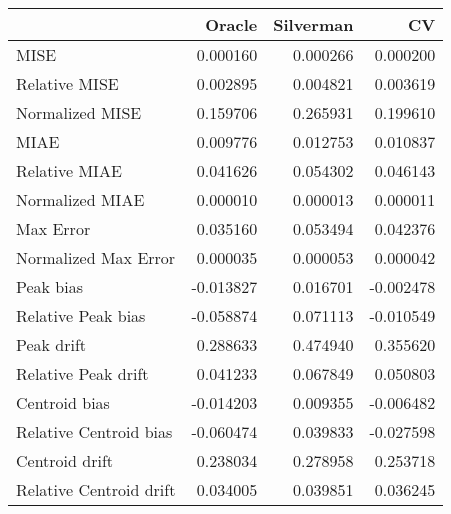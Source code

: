 \begin{tabular}{lrrr}
  \hline
 & Oracle & Silverman & CV \\ 
  \hline
MISE & 0.000160 & 0.000266 & 0.000200 \\ 
  Relative MISE & 0.002895 & 0.004821 & 0.003619 \\ 
  Normalized MISE & 0.159706 & 0.265931 & 0.199610 \\ 
  MIAE & 0.009776 & 0.012753 & 0.010837 \\ 
  Relative MIAE & 0.041626 & 0.054302 & 0.046143 \\ 
  Normalized MIAE & 0.000010 & 0.000013 & 0.000011 \\ 
  Max Error & 0.035160 & 0.053494 & 0.042376 \\ 
  Normalized Max Error & 0.000035 & 0.000053 & 0.000042 \\ 
  Peak bias & -0.013827 & 0.016701 & -0.002478 \\ 
  Relative Peak bias & -0.058874 & 0.071113 & -0.010549 \\ 
  Peak drift & 0.288633 & 0.474940 & 0.355620 \\ 
  Relative Peak drift & 0.041233 & 0.067849 & 0.050803 \\ 
  Centroid bias & -0.014203 & 0.009355 & -0.006482 \\ 
  Relative Centroid bias & -0.060474 & 0.039833 & -0.027598 \\ 
  Centroid drift & 0.238034 & 0.278958 & 0.253718 \\ 
  Relative Centroid drift & 0.034005 & 0.039851 & 0.036245 \\ 
   \hline
\end{tabular}
